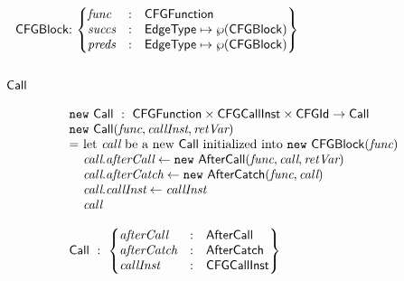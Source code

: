 \hspace*{-2em}
$\begin{array}{@{~}r@{~}l@{}l@{~}l}
& \CFGBlock & : &
\begin{Bmatrix*}[l]
\emph{func} & : & \CFGFunction \\
\emph{succs} & : & \EdgeType \mapsto \powerset{\CFGBlock} \\
\emph{preds} & : & \EdgeType \mapsto \powerset{\CFGBlock} \\
\end{Bmatrix*}\\
\end{array}
$

\subsection{$\mbox{\textsf{Call}}$}
\[
\begin{array}{l@{}l@{~}l}
\lefteqn{\new \ \Call \ : \ \CFGFunction \times \CFGCallInst \times \CFGId \rightarrow \Call} \\
\lefteqn{\new\ \Call(\emph{func}, \emph{callInst}, \emph{retVar})}\\
& = & \text{let } \emph{call} \text{ be a new } \Call \text{ initialized into } \new\ \CFGBlock(\emph{func})\\
& & \emph{call}.\emph{afterCall} \leftarrow \new\ \AfterCall(\emph{func}, \emph{call}, \emph{retVar})\\
& & \emph{call}.\emph{afterCatch} \leftarrow \new\ \AfterCatch(\emph{func}, \emph{call})\\
& & \emph{call}.\emph{callInst} \leftarrow \emph{callInst}\\
& & \emph{call}\\\\
\lefteqn{ \Call \ : \
\begin{Bmatrix*}[l]
\emph{afterCall} & : & \AfterCall\\
\emph{afterCatch} & : & \AfterCatch\\
\emph{callInst} & : & \CFGCallInst\\
\end{Bmatrix*}
}
\end{array}
\]

